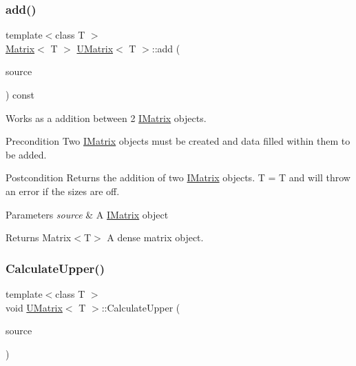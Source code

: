\subsubsection{\texorpdfstring{add()}{add()}\hspace{0.1cm}{\footnotesize\ttfamily [6/6]}}
{\footnotesize\ttfamily template$<$class T $>$ \\
\mbox{\hyperlink{class_matrix}{Matrix}}$<$ T $>$ \mbox{\hyperlink{class_u_matrix}{U\+Matrix}}$<$ T $>$\+::add (\begin{DoxyParamCaption}\item[{const \mbox{\hyperlink{class_i_matrix}{I\+Matrix}}$<$ \mbox{\hyperlink{class_d_matrix}{D\+Matrix}}$<$ T $>$, T $>$ \&}]{source }\end{DoxyParamCaption}) const}



Works as a addition between 2 \mbox{\hyperlink{class_i_matrix}{I\+Matrix}} objects. 

\begin{DoxyPrecond}{Precondition}
Two \mbox{\hyperlink{class_i_matrix}{I\+Matrix}} objects must be created and data filled within them to be added. 
\end{DoxyPrecond}
\begin{DoxyPostcond}{Postcondition}
Returns the addition of two \mbox{\hyperlink{class_i_matrix}{I\+Matrix}} objects. T = T and will throw an error if the sizes are off.
\end{DoxyPostcond}

\begin{DoxyParams}{Parameters}
{\em source} & A \mbox{\hyperlink{class_i_matrix}{I\+Matrix}} object \\
\hline
\end{DoxyParams}
\begin{DoxyReturn}{Returns}
Matrix$<$\+T$>$ A dense matrix object. 
\end{DoxyReturn}
\mbox{\label{class_u_matrix_a63af4ca40c18c71bd0609d4511779852}} 
\subsubsection{\texorpdfstring{CalculateUpper()}{CalculateUpper()}}
{\footnotesize\ttfamily template$<$class T $>$ \\
void \mbox{\hyperlink{class_u_matrix}{U\+Matrix}}$<$ T $>$\+::Calculate\+Upper (\begin{DoxyParamCaption}\item[{const \mbox{\hyperlink{class_matrix}{Matrix}}$<$ T $>$ \&}]{source }\end{DoxyParamCaption})}



